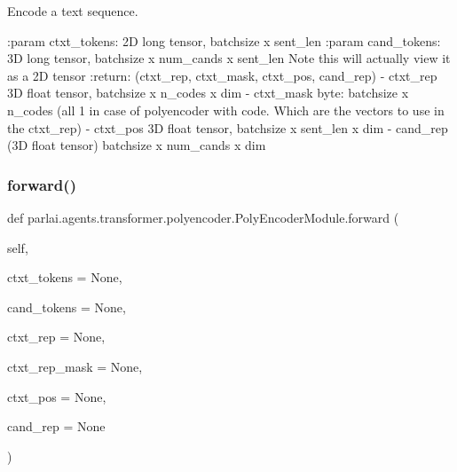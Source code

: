 \begin{DoxyVerb}Encode a text sequence.

:param ctxt_tokens:
    2D long tensor, batchsize x sent_len
:param cand_tokens:
    3D long tensor, batchsize x num_cands x sent_len
    Note this will actually view it as a 2D tensor
:return:
    (ctxt_rep, ctxt_mask, ctxt_pos, cand_rep)
    - ctxt_rep 3D float tensor, batchsize x n_codes x dim
    - ctxt_mask byte:  batchsize x n_codes (all 1 in case
    of polyencoder with code. Which are the vectors to use
    in the ctxt_rep)
    - ctxt_pos 3D float tensor, batchsize x sent_len x dim
    - cand_rep (3D float tensor) batchsize x num_cands x dim
\end{DoxyVerb}
 \mbox{\label{classparlai_1_1agents_1_1transformer_1_1polyencoder_1_1PolyEncoderModule_a9e769210d947e88dc3e4555583b9c82e}} 
\subsubsection{\texorpdfstring{forward()}{forward()}}
{\footnotesize\ttfamily def parlai.\+agents.\+transformer.\+polyencoder.\+Poly\+Encoder\+Module.\+forward (\begin{DoxyParamCaption}\item[{}]{self,  }\item[{}]{ctxt\+\_\+tokens = {\ttfamily None},  }\item[{}]{cand\+\_\+tokens = {\ttfamily None},  }\item[{}]{ctxt\+\_\+rep = {\ttfamily None},  }\item[{}]{ctxt\+\_\+rep\+\_\+mask = {\ttfamily None},  }\item[{}]{ctxt\+\_\+pos = {\ttfamily None},  }\item[{}]{cand\+\_\+rep = {\ttfamily None} }\end{DoxyParamCaption})}

